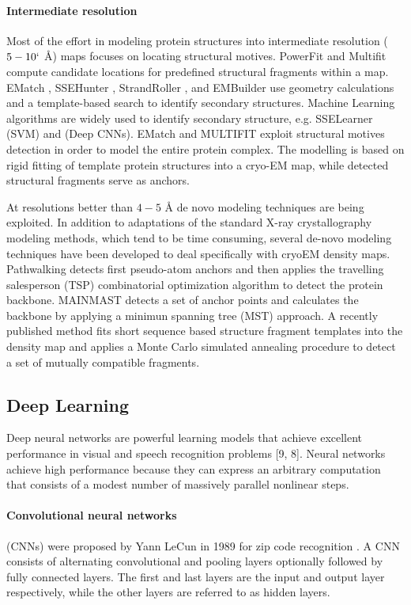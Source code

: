 \paragraph{Intermediate resolution }
Most of the effort in modeling protein structures into intermediate resolution ($5 - 10`$ {\AA}) maps focuses on locating structural motives.
PowerFit \cite{C.P.vanZundert2015} and Multifit \cite{Tjioe2011} compute candidate  locations  for predefined structural fragments within a map.
EMatch  \cite{Dror2006}, SSEHunter \cite{Baker2007a}, StrandRoller \cite{Si}, and EMBuilder \cite{Zhou2017} use geometry calculations and a template-based search
to identify secondary structures.
Machine Learning algorithms are widely used to identify secondary structure, e.g.  SSELearner \cite{Si2012} (SVM) and \cite{Li2016} (Deep CNNs).
EMatch \cite{Dror2006} and MULTIFIT \cite{Tjioe2011} exploit   structural motives detection in order to model the  entire protein complex.
The modelling is based on rigid fitting of template protein structures into a cryo-EM map, while detected structural fragments serve as anchors.

At resolutions better than $4-5$ {{{\AA}}} de novo modeling techniques are being exploited. 
In addition to  adaptations of the standard X-ray crystallography modeling methods, which tend to be time consuming, several de-novo modeling techniques have been developed to deal specifically with cryoEM density maps\cite{DiMaio2016}.  Pathwalking \cite{Chen2016} detects first pseudo-atom anchors and then applies the travelling salesperson (TSP) combinatorial optimization algorithm to detect the protein backbone.
MAINMAST \cite{Terashi2018} detects a set of anchor points and calculates the backbone by applying  a minimun spanning tree (MST) approach.
A recently published method \cite{Zhou2017a}  fits short sequence based structure fragment templates into the density map and applies a Monte Carlo simulated annealing procedure to detect a set of mutually compatible fragments.  
\subsection{Deep Learning}
Deep neural networks are powerful learning models that achieve excellent performance in visual and
speech recognition problems [9, 8].
Neural networks achieve high performance because they can
express an arbitrary computation that consists of a modest number of massively parallel nonlinear steps.
\paragraph{Convolutional neural networks} (CNNs) were proposed by Yann LeCun in 1989 for zip code recognition \cite{Y.LeCunB.BoserJ.S.DenkerD.HendersonR.E.Howard1989}.
A CNN consists of alternating convolutional and pooling layers optionally followed by fully connected layers.
The first and last layers are  the input and  output layer respectively, while the other layers are referred to as hidden layers.

